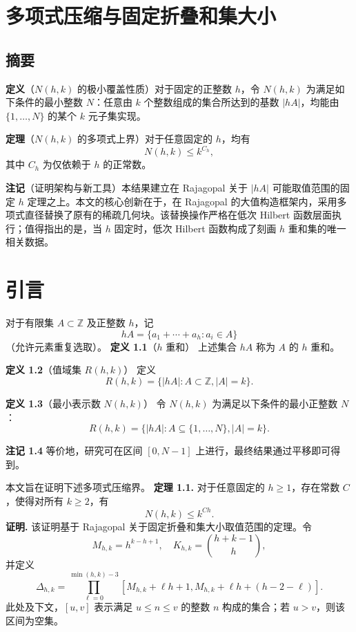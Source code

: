 \documentclass[11pt]{article}
\theoremstyle{break}
\begin{document}
\section{多项式压缩与固定折叠和集大小}
\subsection{摘要}
\textbf{定义}（$N(h,k)$ 的极小覆盖性质）对于固定的正整数 $h$，令 $N(h,k)$ 为满足如下条件的最小整数 $N$：任意由 $k$ 个整数组成的集合所达到的基数 $|hA|$，均能由 $\{1,\dots,N\}$ 的某个 $k$ 元子集实现。

\textbf{定理}（$N(h,k)$ 的多项式上界）对于任意固定的 $h$，均有
\[ N(h,k) \le k^{C_h}, \]
其中 $C_h$ 为仅依赖于 $h$ 的正常数。

\textbf{注记}（证明架构与新工具）本结果建立在 Rajagopal 关于 $|hA|$ 可能取值范围的固定 $h$ 定理之上。本文的核心创新在于，在 Rajagopal 的大值构造框架内，采用多项式直径替换了原有的稀疏几何块。该替换操作严格在低次 Hilbert 函数层面执行；值得指出的是，当 $h$ 固定时，低次 Hilbert 函数构成了刻画 $h$ 重和集的唯一相关数据。
\section{引言}

对于有限集 $A \subset \mathbb{Z}$ 及正整数 $h$，记
\[
hA = \{a_1 + \cdots + a_h : a_i \in A\}
\]
（允许元素重复选取）。
\textbf{定义 1.1}（$h$ 重和） 上述集合 $hA$ 称为 $A$ 的 $h$ 重和。

\textbf{定义 1.2}（值域集 $R(h,k)$） 定义
\[
R(h,k) = \{|hA| : A \subset \mathbb{Z}, |A| = k\}.
\]

\textbf{定义 1.3}（最小表示数 $N(h,k)$） 令 $N(h,k)$ 为满足以下条件的最小正整数 $N$：
\[
R(h,k) = \{|hA| : A \subseteq \{1,\dots,N\}, |A| = k\}.
\]

\textbf{注记 1.4} 等价地，研究可在区间 $[0, N-1]$ 上进行，最终结果通过平移即可得到。

本文旨在证明下述多项式压缩界。
\textbf{定理 1.1.} 对于任意固定的 $h \ge 1$，存在常数 $C$，使得对所有 $k \ge 2$，有
\[ N(h,k) \le k^{C h}. \]
\textbf{证明.} 该证明基于 Rajagopal 关于固定折叠和集大小取值范围的定理。令
\[ M_{h,k} = h^{k-h+1}, \quad K_{h,k} = \binom{h+k-1}{h}, \]
并定义
\[ \Delta_{h,k} = \prod_{\ell=0}^{\min(h,k)-3} [M_{h,k} + \ell h + 1, M_{h,k} + \ell h + (h-2-\ell)]. \]
此处及下文，$[u,v]$ 表示满足 $u \le n \le v$ 的整数 $n$ 构成的集合；若 $u > v$，则该区间为空集。
\end{document}
